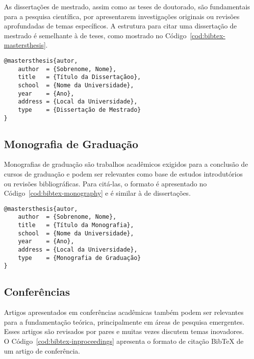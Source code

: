 \documentclass[
    12pt
    ,oneside
    ,a4paper
    ,chapter=TITLE
    ,section=TITLE
    ,sumario=abnt-6027-2012]{abntex2}
\begin{document}
As dissertações de mestrado, assim como as teses de doutorado, são fundamentais para a pesquisa científica, por apresentarem investigações originais ou revisões aprofundadas de temas específicos. A estrutura para citar uma dissertação de mestrado é semelhante à de teses, como mostrado no Código~\ref{cod:bibtex-mastersthesis}.

\begin{codigo}[htb]
\begin{lstlisting}
@mastersthesis{autor,
    author  = {Sobrenome, Nome},
    title   = {Título da Dissertaçãoo},
    school  = {Nome da Universidade},
    year    = {Ano},
    address = {Local da Universidade},
    type    = {Dissertação de Mestrado}
}
\end{lstlisting}
\fonteautor
\end{codigo}

\subsection{Monografia de Graduação}

Monografias de graduação são trabalhos acadêmicos exigidos para a conclusão de cursos de graduação e podem ser relevantes como base de estudos introdutórios ou revisões bibliográficas. Para citá-las, o formato é apresentado no Código~\ref{cod:bibtex-monography} e é similar à de dissertações.

\begin{codigo}[htb]
\begin{lstlisting}
@mastersthesis{autor,
    author  = {Sobrenome, Nome},
    title   = {Título da Monografia},
    school  = {Nome da Universidade},
    year    = {Ano},
    address = {Local da Universidade},
    type    = {Monografia de Graduação}
}
\end{lstlisting}
\fonteautor
\end{codigo}

\subsection{Conferências}

Artigos apresentados em conferências acadêmicas também podem ser relevantes para a fundamentação teórica, principalmente em áreas de pesquisa emergentes. Esses artigos são revisados por pares e muitas vezes discutem temas inovadores. O Código~\ref{cod:bibtex-inproceedings} apresenta o formato de citação BibTeX de um artigo de conferência.
\end{document}
